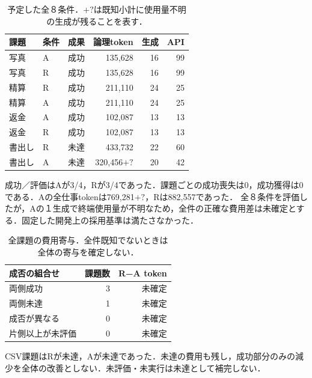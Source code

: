 \begin{table}[tb]
\centering\footnotesize\setlength{\tabcolsep}{3pt}
\caption{予定した全８条件．$+?$は既知小計に使用量不明の生成が残ることを表す．}
\begin{tabular}{lllrrr}
課題 & 条件 & 成果 & 論理token & 生成 & API \\ \hline
写真 & A & 成功 & 135,628 & 16 & 99 \\
写真 & R & 成功 & 135,628 & 16 & 99 \\
精算 & R & 成功 & 211,110 & 24 & 25 \\
精算 & A & 成功 & 211,110 & 24 & 25 \\
返金 & A & 成功 & 102,087 & 13 & 13 \\
返金 & R & 成功 & 102,087 & 13 & 13 \\
書出し & R & 未達 & 433,732 & 22 & 60 \\
書出し & A & 未達 & 320,456$+?$ & 20 & 42 \\
\hline\end{tabular}
\end{table}
成功／評価はAが3/4，Rが3/4であった．課題ごとの成功喪失は0，成功獲得は0である．Aの全仕事tokenは769,281$+?$，Rは882,557であった．
全８条件を評価したが，Aの１生成で終端使用量が不明なため，全件の正確な費用差は未確定とする．固定した開発上の採用基準は満たさなかった．
\begin{table}[tb]
\centering\footnotesize\setlength{\tabcolsep}{3pt}
\caption{全課題の費用寄与．全件既知でないときは全体の寄与を確定しない．}
\begin{tabular}{lrr}
成否の組合せ & 課題数 & R−A token \\ \hline
両側成功 & 3 & 未確定 \\
両側未達 & 1 & 未確定 \\
成否が異なる & 0 & 未確定 \\
片側以上が未評価 & 0 & 未確定 \\
\hline\end{tabular}
\end{table}
CSV課題はRが未達，Aが未達であった．未達の費用も残し，成功部分のみの減少を全体の改善としない．未評価・未実行は未達として補完しない．
